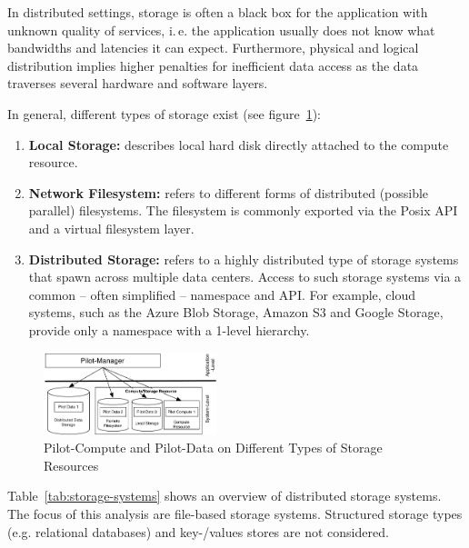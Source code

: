 \documentclass[conference]{IEEEtran}
\begin{document}
In distributed settings, storage is often a black box for the application with
unknown quality of services, i.\,e. the application usually does not know what
bandwidths and latencies it can expect. Furthermore, physical and logical
distribution implies higher penalties for inefficient data access as the data
traverses several hardware and software layers.


In general, different types of storage exist (see 
figure~\ref{fig:figures_storage-types}):

\begin{enumerate}
	\item \textbf{Local Storage:} describes local hard disk directly attached 
	to the compute resource.
	\item \textbf{Network Filesystem:} refers to different forms of 
	distributed (possible parallel) filesystems. The filesystem is commonly 
	exported via the Posix API and a virtual filesystem layer.
	\item \textbf{Distributed Storage:} refers to a highly distributed type of 
	storage systems that spawn across multiple data centers. Access to such 
	storage systems via a common -- often simplified -- namespace and API. For 
	example, cloud systems, such as the Azure Blob Storage, Amazon S3 and 
	Google Storage, provide only a namespace with a 1-level hierarchy. 
\end{enumerate}




\begin{figure}[t]
	\centering
		\includegraphics[width=0.45\textwidth]{figures/storage-types.pdf}
	\caption{Pilot-Compute and Pilot-Data on Different Types of Storage Resources}
	\label{fig:figures_storage-types}
\end{figure}



Table~\ref{tab:storage-systems} shows an overview of distributed storage 
systems. The focus of this analysis are file-based storage systems. Structured
storage types (e.g. relational databases) and key-/values stores are not 
considered.
\end{document}
